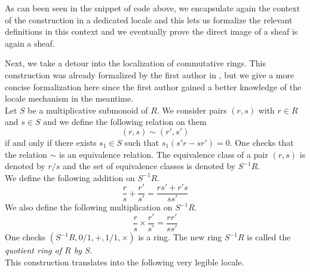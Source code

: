 \documentclass[12pt]{scrartcl}
\begin{document}
As can been seen in the snippet of code above, we encapsulate again the context of the construction in a dedicated locale and this lets us formalize the relevant definitions in this context and we eventually prove the direct image of a sheaf is again a sheaf. 

Next, we take a detour into the localization of commutative rings. This construction was already formalized by the first author in \cite{bordg18}, but we give a more concise formalization here since the first author gained a better knowledge of the locale mechanism in the meantime. \\
Let $S$ be a multiplicative submonoid of $R$. We consider pairs $(r, s)$ with $r \in R$ and $s \in S$ and we define the following relation on them
	\[
	(r, s) \sim (r', s')
	\]
if and only if there exists $s_1 \in S$ such that $s_1(s' r - s r') = 0$. One checks that the relation $\sim$ is an equivalence relation. The equivalence class of a pair $(r, s)$ is denoted by $r/s$ and the set of equivalence classes is denoted by $S^{-1} R$. \\
We define the following addition on $S^{-1} R$.
	\[
	\frac{r}{s} + \frac{r'}{s'} = \frac{r s' + r' s}{s s'}
	\]
We also define the following multiplication on $S^{-1} R$. 
	\[
	\frac{r}{s} \times \frac{r'}{s'} = \frac{r r'}{s s'}
	\]
One checks $(S^{-1} R, 0/1, +, 1/1, \times)$ is a ring. The new ring $S^{-1} R$ is called the \emph{quotient ring of $R$ by $S$}. \\
This construction translates into the following very legible locale.

\end{document}
